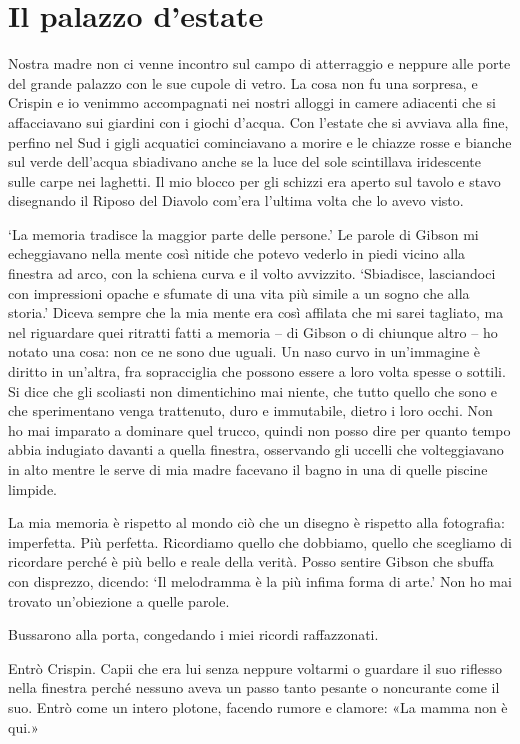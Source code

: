 \chapter{Il palazzo d'estate}

Nostra madre non ci venne incontro sul campo di atterraggio e neppure
alle porte del grande palazzo con le sue cupole di vetro. La cosa non fu
una sorpresa, e Crispin e io venimmo accompagnati nei nostri alloggi in
camere adiacenti che si affacciavano sui giardini con i giochi d'acqua.
Con l'estate che si avviava alla fine, perfino nel Sud i gigli acquatici
cominciavano a morire e le chiazze rosse e bianche sul verde dell'acqua
sbiadivano anche se la luce del sole scintillava iridescente sulle carpe
nei laghetti. Il mio blocco per gli schizzi era aperto sul tavolo e
stavo disegnando il Riposo del Diavolo com'era l'ultima volta che lo
avevo visto.

`La memoria tradisce la maggior parte delle persone.' Le parole di
Gibson mi echeggiavano nella mente così nitide che potevo vederlo in
piedi vicino alla finestra ad arco, con la schiena curva e il volto
avvizzito. `Sbiadisce, lasciandoci con impressioni opache e sfumate di
una vita più simile a un sogno che alla storia.' Diceva sempre che la
mia mente era così affilata che mi sarei tagliato, ma nel riguardare
quei ritratti fatti a memoria -- di Gibson o di chiunque altro -- ho
notato una cosa: non ce ne sono due uguali. Un naso curvo in un'immagine
è diritto in un'altra, fra sopracciglia che possono essere a loro volta
spesse o sottili. Si dice che gli scoliasti non dimentichino mai niente,
che tutto quello che sono e che sperimentano venga trattenuto, duro e
immutabile, dietro i loro occhi. Non ho mai imparato a dominare quel
trucco, quindi non posso dire per quanto tempo abbia indugiato davanti a
quella finestra, osservando gli uccelli che volteggiavano in alto mentre
le serve di mia madre facevano il bagno in una di quelle piscine
limpide.

La mia memoria è rispetto al mondo ciò che un disegno è rispetto alla
fotografia: imperfetta. Più perfetta. Ricordiamo quello che dobbiamo,
quello che scegliamo di ricordare perché è più bello e reale della
verità. Posso sentire Gibson che sbuffa con disprezzo, dicendo: `Il
melodramma è la più infima forma di arte.' Non ho mai trovato
un'obiezione a quelle parole.

Bussarono alla porta, congedando i miei ricordi raffazzonati.

Entrò Crispin. Capii che era lui senza neppure voltarmi o guardare il
suo riflesso nella finestra perché nessuno aveva un passo tanto pesante
o noncurante come il suo. Entrò come un intero plotone, facendo rumore e
clamore: «La mamma non è qui.»


